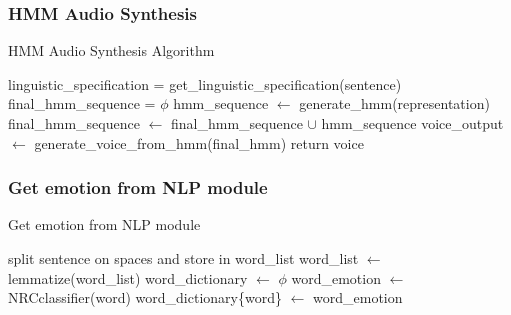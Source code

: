 \documentclass[oneside,a4paper,12pt]{book}
\begin{document}
\subsubsection{HMM Audio Synthesis}
\begin{algorithm}
	\caption{HMM Audio Synthesis Algorithm}
	\label{HMMAudio}
	\begin{algorithmic}[1]
		\State linguistic\_specification = get\_linguistic\_specification(sentence)
		\State final\_hmm\_sequence = $\phi$
		\State hmm\_sequence $\leftarrow$ generate\_hmm(representation)
		\State final\_hmm\_sequence $\leftarrow$ final\_hmm\_sequence $\cup$ hmm\_sequence
		\EndFor
		\State voice\_output $\leftarrow$ generate\_voice\_from\_hmm(final\_hmm)
		\State return voice
		\EndProcedure
	\end{algorithmic}
\end{algorithm}


	\subsubsection{Get emotion from NLP module}
	\begin{algorithm}
		\caption{Get emotion from NLP module}
		\label{NLP}
		\begin{algorithmic}[1]
			\State split sentence on spaces and store in word\_list
			\State word\_list $\leftarrow$ lemmatize(word\_list)
			\State word\_dictionary $\leftarrow$ $\phi$
			\State word\_emotion $\leftarrow$ NRCclassifier(word)
			\State word\_dictionary\{word\} $\leftarrow$ word\_emotion
			\EndFor
		\end{algorithmic}
	\end{algorithm}
\end{document}

